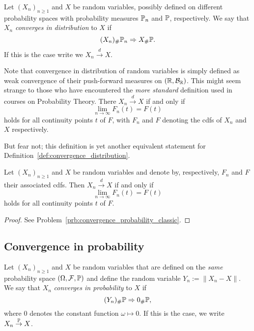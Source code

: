 \begin{definition}\label{def:convergence_distribution}
Let $(X_n)_{n \ge 1}$ and $X$ be random variables, possibly defined on different probability spaces with probability measures $\mathbb P_n$ and $\mathbb P$, respectively. We say that $X_n$ \emph{converges in distribution} to $X$ if
\[
	(X_n)_\# \mathbb P_n \Rightarrow X_\# \mathbb P.
\]
If this is the case write we $X_n \stackrel{d}{\rightarrow} X$.
\end{definition}

Note that convergence in distribution of random variables is simply defined as weak convergence of their push-forward measures on $(\mathbb R, \mathcal B_{\mathbb R})$. This might seem strange to those who have encountered the \emph{more standard} definition used in courses on Probability Theory. There $X_n \stackrel{d}{\rightarrow} X$ if and only if
\[
	\lim_{n \to \infty} F_n(t) = F(t)
\]
holds for all continuity points $t$ of $F$, with $F_n$ and $F$ denoting the cdfs of $X_n$ and $X$ respectively.

But fear not; this definition is yet another equivalent statement for Definition~\ref{def:convergence_distribution}. 


\begin{lemma}\label{lem:convergence_distribution_cdfs}
Let $(X_n)_{n \ge 1}$ and $X$ be random variables and denote by, respectively, $F_n$ and $F$ their associated cdfs. Then
$X_n \stackrel{d}{\rightarrow} X$ if and only if
\[
	\lim_{n \to \infty} F_n(t) = F(t)
\]
holds for all continuity points $t$ of $F$.
\end{lemma}

\begin{proof}
See Problem~\ref{prb:convergence_probability_classic}.
\end{proof}



\subsection{Convergence in probability}

\begin{definition}\label{def:convergence_probability}
Let $(X_n)_{n \ge 1}$ and $X$ be random variables that are defined on the \emph{same} probability space $(\Omega, \mathcal F, \mathbb P)$ and define the random variable $Y_n := \|X_n - X\|$. We say that $X_n$ \emph{converges in probability} to $X$ if
\[
	(Y_n)_\# \mathbb P \Rightarrow 0_\# \mathbb P,
\] 
where $0$ denotes the constant function $\omega \mapsto 0$. If this is the case, we write $X_n \stackrel{\mathbb P}{\rightarrow} X$.
\end{definition}

